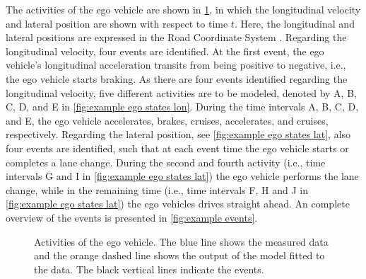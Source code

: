 \documentclass[10pt,final,a4paper,oneside,onecolumn]{article}
\newlength\figurewidth
\newlength\figureheight
\theoremstyle{plain}\newtheorem{definition}{Definition}[section]    %
\theoremstyle{definition}\newtheorem{example}{Example}[section]     %
\theoremstyle{remark}\newtheorem{remarkenv}{Remark}[section]        %
\begin{document}
The activities of the ego vehicle are shown in \cref{fig:example ego states}, in which the longitudinal velocity and lateral position are shown with respect to time $t$. Here, the longitudinal and lateral positions are expressed in the Road Coordinate System \cite{zofka2015datadrivetrafficscenarios}. Regarding the longitudinal velocity, four events are identified. At the first event, the ego vehicle's longitudinal acceleration transits from being positive to negative, i.e., the ego vehicle starts braking. As there are four events identified regarding the longitudinal velocity, five different activities are to be modeled, denoted by A, B, C, D, and E in \cref{fig:example ego states lon}. During the time intervals A, B, C, D, and E, the ego vehicle accelerates, brakes, cruises, accelerates, and cruises, respectively. Regarding the lateral position, see \cref{fig:example ego states lat}, also four events are identified, such that at each event time the ego vehicle starts or completes a lane change. During the second and fourth activity (i.e., time intervals G and I in \cref{fig:example ego states lat}) the ego vehicle performs the lane change, while in the remaining time (i.e., time intervals F, H and J in \cref{fig:example ego states lat}) the ego vehicles drives straight ahead. An complete overview of the events is presented in \cref{fig:example events}.

\setlength\figureheight{170pt}
\setlength{}
\begin{figure}
	\centering
	\begin{minipage}[b]{0.49\linewidth}
		\centering
		\label{fig:example ego states lon}
	\end{minipage}%
	\hfill
	\begin{minipage}[b]{0.49\linewidth}
		\centering
		\label{fig:example ego states lat}
	\end{minipage}%
	\caption{Activities of the ego vehicle. The blue line shows the measured data and the orange dashed line shows the output of the model fitted to the data. The black vertical lines indicate the events.}
	\label{fig:example ego states}
\end{figure}
\end{document}
